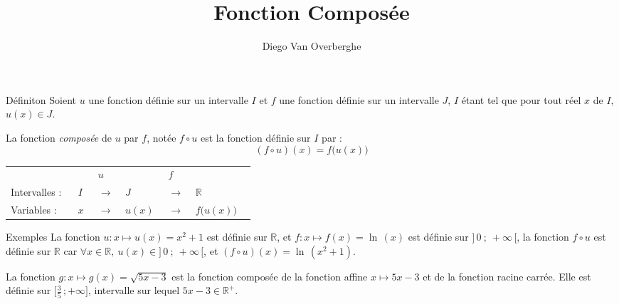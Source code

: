 \documentclass{cours}
\title{Fonction Composée}
\author{Diego Van Overberghe}
\begin{document}

    \begin{Gpartie}{Définiton} 
        Soient $u$ une fonction définie sur un intervalle $I$ et $f$ une fonction définie sur un intervalle $J$, $I$ étant tel que pour tout réel $x$ de $I$, $u(x)\in J$.

        La fonction \emph{composée} de $u$ par $f$, notée $f\circ u$ est la fonction définie sur $I$ par :
        \[\boxed{(f\circ u)(x)=f\big(u(x)\big)}\]

        \begin{center}\begin{tabular}{ p{0.15\linewidth} *{2}{M{0.05\linewidth} M{0.025\linewidth} } M{0.1\linewidth} }
            & $u$           &       & $f$           &                   \\
            Intervalles :& $I$   & $\rightarrow$ & $J$   & $\rightarrow$ & $\mathbb{R}$      \\
            Variables :  & $x$   & $\rightarrow$ & $u(x)$& $\rightarrow$ & $f\big(u(x)\big)$ \\
        \end{tabular}\end{center}
        \parbox{\linewidth}{}
        \begin{Spartie}{Exemples} 
            La fonction $u:x\mapsto u(x)=x^2+1$ est définie sur $\mathbb{R}$, et $f:x\mapsto f(x)=\ln\,(x)$ est définie sur $\big]\,0~;~+\infty\,\big[$, la fonction $f\circ u$ est définie sur $\mathbb{R}$ car $\forall x\in\mathbb{R},~u(x)\in\big]\,0~;~+\infty\,\big[$, et $(f\circ u)(x)=\ln\,\left(x^2+1\right)$.

            La fonction $g:x\mapsto g(x)=\sqrt{5x-3}$ est la fonction composée de la fonction affine $x\mapsto 5x-3$ et de la fonction racine carrée. Elle est définie sur $\Big[\frac{3}{5}\,;+\infty\Big]$, intervalle sur lequel $5x-3\in\mathbb{R^{+}}$.
        \end{Spartie}
    \end{Gpartie}
    \pagebreak
\end{document}
